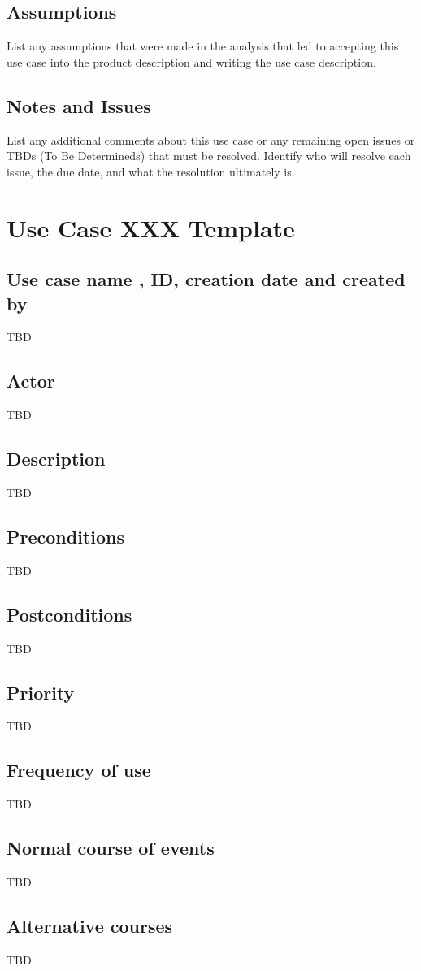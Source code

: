 \documentclass[a4paper]{article}
\begin{document}
\subsection{Assumptions}
List any assumptions that were made in the analysis that led to accepting this use case into the product description and writing the use case description.
\subsection{Notes and Issues}
List any additional comments about this use case or any remaining open issues or TBDs (To Be Determineds) that must be resolved. Identify who will resolve each issue, the due date, and what the resolution ultimately is.

\newpage

\section{Use Case XXX Template}
\subsection{Use case name , ID, creation date and created by }
TBD
\subsection{Actor}
TBD
\subsection{Description}
TBD
\subsection{Preconditions}
TBD
\subsection{Postconditions}
TBD
\subsection{Priority}
TBD
\subsection{Frequency of use}
TBD
\subsection{Normal course of events}
TBD
\subsection{Alternative courses}
TBD
\end{document}
